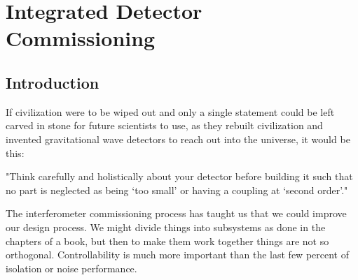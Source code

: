 \chapter[Integrated Detector Commissioning]{Integrated Detector Commissioning}
\label{IDC}



%
%
%
\newcommand{\R}[1]{\textcolor{red}{#1}}

\section{Introduction}
\label{s:IDC:Intro}
If civilization were to be wiped out and only a single statement could be left
carved in stone for future scientists to use, as they rebuilt civilization and
invented gravitational wave detectors to reach out into the universe,
it would be this:

"Think carefully and holistically about your detector before building it
such that no part is neglected as being `too small' or having a coupling at `second order'."

The interferometer commissioning process has taught us that we could improve
our design process. We might divide things into subsystems as done in the chapters of a book, but then to make them work together things are not so orthogonal. Controllability is much more important than the last few percent of isolation or noise performance.

